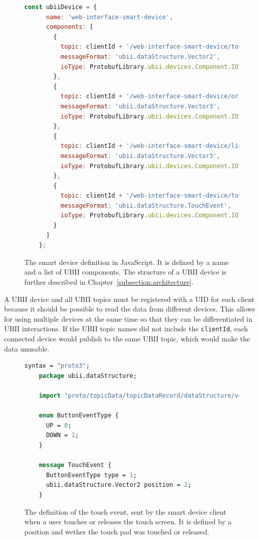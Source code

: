 \begin{figure}[H]
  \begin{lstlisting}[language=JavaScript]
    const ubiiDevice = {
      name: 'web-interface-smart-device',
      components: [
        {
          topic: clientId + '/web-interface-smart-device/touch_position',
          messageFormat: 'ubii.dataStructure.Vector2',
          ioType: ProtobufLibrary.ubii.devices.Component.IOType.INPUT
        },
        {
          topic: clientId + '/web-interface-smart-device/orientation',
          messageFormat: 'ubii.dataStructure.Vector3',
          ioType: ProtobufLibrary.ubii.devices.Component.IOType.INPUT
        },
        {
          topic: clientId + '/web-interface-smart-device/linear_acceleration',
          messageFormat: 'ubii.dataStructure.Vector3',
          ioType: ProtobufLibrary.ubii.devices.Component.IOType.INPUT
        },
        {
          topic: clientId + '/web-interface-smart-device/touch_events',
          messageFormat: 'ubii.dataStructure.TouchEvent',
          ioType: ProtobufLibrary.ubii.devices.Component.IOType.INPUT
        }
      ]
    };
  \end{lstlisting}
  \caption[Protobuf definition of the smart device]{The smart device definition in JavaScript. It is defined by a name and a list of \ac{UBII} components. The structure of a \ac{UBII} device is further described in Chapter~\ref{subsection:architecture}.}\label{fig:ubii-device-registration}
\end{figure}

A \ac{UBII} device and all \ac{UBII} topics must be registered with a \ac{UID} for each client because it should be possible to read the data from different devices. This allows for using multiple devices at the same time so that they can be differentiated in \ac{UBII} interactions. If the \ac{UBII} topic names did not include the \lstinline{clientId}, each connected device would publish to the same \ac{UBII} topic, which would make the data unusable.

\begin{figure}[H]
  \begin{lstlisting}[language=Protobuf]
    syntax = "proto3";
    package ubii.dataStructure;
    
    import "proto/topicData/topicDataRecord/dataStructure/vector2.proto";
    
    enum ButtonEventType {
      UP = 0;
      DOWN = 1;
    }

    message TouchEvent {
      ButtonEventType type = 1;
      ubii.dataStructure.Vector2 position = 2;
    }
  \end{lstlisting}
  \caption[Protobuf definition of the touch event]{The definition of the touch event, sent by the smart device client when a user touches or releases the touch screen. It is defined by a position and wether the touch pad was touched or released.}\label{fig:ubii-event-type}
\end{figure}

